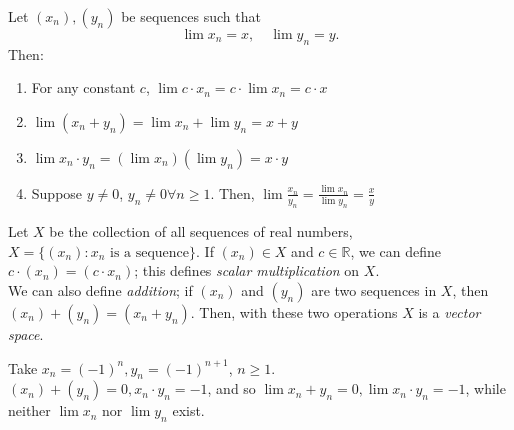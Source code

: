 \documentclass[12pt]{article}
\begin{document}
\begin{proposition}\label{prop:apl}
  Let $(x_n), (y_n)$ be sequences such that\footnotemark \[\lim x_n = x, \quad \lim y_n = y.\]
  Then:
  \begin{enumerate}
    \item For any constant $c$, \(\lim c \cdot x_n = c \cdot \lim x_n = c\cdot x\)
    \item $\lim (x_n + y_n) = \lim x_n + \lim y_n = x+y$
    \item $\lim x_n \cdot y_n = (\lim x_n)(\lim y_n) = x\cdot y$
    \item Suppose $y \neq 0$, $y_n \neq 0 \forall n \geq 1$. Then, $\lim \frac{x_n}{y_n} = \frac{\lim x_n}{\lim y_n} = \frac{x}{y}$
  \end{enumerate}
\end{proposition}

\begin{remark}
  Let $X$ be the collection of all sequences of real numbers, $X = \{(x_n): x_n \text{ is a sequence}\}.$ If $(x_n) \in X$ and $c \in \mathbb{R}$, we can define $c \cdot(x_n) = (c\cdot x_n)$\footnotemark; this defines \emph{scalar multiplication} on $X$.\\ We can also define \emph{addition}; if $(x_n)$ and $(y_n)$ are two sequences in $X$, then $(x_n) + (y_n) = (x_n + y_n)$. Then, with these two operations $X$ is a \emph{vector space}.
\end{remark}


\begin{example}\label{example:counterlimitalgebra}
  Take $x_n = (-1)^n, y_n = (-1)^{n+1}$, $n \geq 1$.\\
  $(x_n) + (y_n) = 0, x_n \cdot y_n = -1$, and so $\lim x_n + y_n = 0, \lim x_n \cdot y_n = -1$, while neither $\lim x_n$ nor $\lim y_n$ exist.
\end{example}
\end{document}
